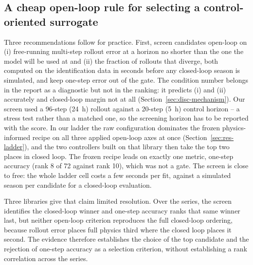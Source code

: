 \subsection{A cheap open-loop rule for selecting a control-oriented surrogate}
\label{sec:disc-rule}

Three recommendations follow for practice. First, screen candidates open-loop on
(i) free-running multi-step rollout error at a horizon no shorter than the one the
model will be used at and (ii) the fraction of rollouts that diverge, both computed on
the identification data in seconds before any closed-loop season is simulated, and
keep one-step error out of the gate. The condition number belongs in the report as a
diagnostic but not in the ranking: it predicts (i) and (ii) accurately and closed-loop
margin not at all (Section~\ref{sec:disc-mechanism}). Our screen used a 96-step
(24~h) rollout against a 20-step (5~h) control horizon -- a stress test rather than a matched one, so the screening
horizon has to be reported with the score. In our ladder the
raw configuration dominates the frozen physics-informed recipe on all three
applied open-loop axes at once (Section~\ref{sec:res-ladder}), and the two
controllers built on that library then take the top two places in closed loop.
The frozen recipe leads on exactly one metric, one-step accuracy (rank 8 of 72
against rank 10), which was not a gate. The screen is close to free: the whole
ladder cell costs a few seconds per fit, against a simulated season per candidate
for a closed-loop evaluation.

Three libraries give that claim limited resolution. Over the series, the screen
identifies the closed-loop winner and one-step accuracy ranks that same winner last,
but neither open-loop criterion reproduces the full closed-loop ordering, because
rollout error places full physics third where the closed loop places it second. The
evidence therefore establishes the choice of the top candidate and the rejection of
one-step accuracy as a selection criterion, without establishing a rank correlation
across the series.


